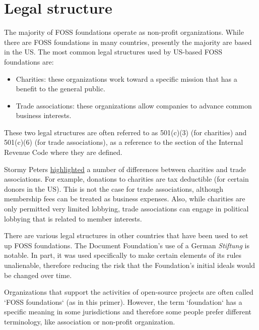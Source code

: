 


\chapter{Legal structure}

The majority of FOSS foundations operate as non-profit organizations.  While there are FOSS foundations in many countries, presently the majority are based in the US.  The most common legal structures used by US-based FOSS foundations are:

\begin{itemize}

\item Charities: these organizations work toward a specific mission that has a benefit to the general public.

\item Trade associations: these organizations allow companies to advance common business interests.

\end {itemize}

These two legal structures are often referred to as 501(c)(3) (for charities) and 501(c)(6) (for trade associations), as a reference to the section of the Internal Revenue Code where they are defined.

Stormy Peters \href{http://stormyscorner.com/2008/08/501c-3-versus-6.html}{highlighted} a number of differences between charities and trade associations.  For example, donations to charities are tax deductible (for certain donors in the US).  This is not the case for trade associations, although membership fees can be treated as business expenses.  Also, while charities are only permitted very limited lobbying, trade associations can engage in political lobbying that is related to member interests.

There are various legal structures in other countries that have been used to set up FOSS foundations.  The Document Foundation's use of a German \textit{Stiftung} is notable.  In part, it was used specifically to make certain elements of its rules unalienable, therefore reducing the risk that the Foundation's initial ideals would be changed over time.

\begin{kaobox}[frametitle=FOSS foundations: what's in a name?]

Organizations that support the activities of open-source projects are often called `FOSS foundations` (as in this primer).  However, the term `foundation` has a specific meaning in some jurisdictions and therefore some people prefer different terminology, like association or non-profit organization.

\end{kaobox}

